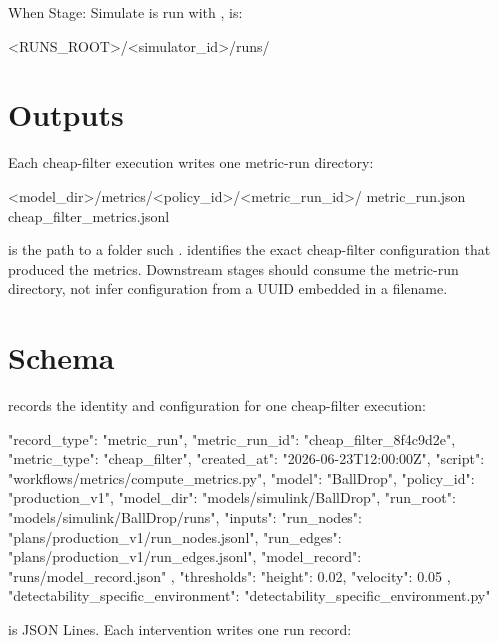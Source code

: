 \documentclass[11pt]{article}
\begin{document}
When Stage: Simulate is run with ,  is:

\begin{DocCode}
<RUNS_ROOT>/<simulator_id>/runs/
\end{DocCode}

\section*{Outputs}

Each cheap-filter execution writes one metric-run directory:

\begin{DocCode}
<model_dir>/metrics/<policy_id>/<metric_run_id>/
  metric_run.json
  cheap_filter_metrics.jsonl
\end{DocCode}

 is the path to a folder such .
 identifies the exact cheap-filter configuration that produced the metrics.
Downstream stages should consume the metric-run directory, not infer configuration from a UUID embedded in a filename.

\section*{Schema}

 records the identity and configuration for one cheap-filter execution:

\begin{DocCode}
{
  "record_type": "metric_run",
  "metric_run_id": "cheap_filter_8f4c9d2e",
  "metric_type": "cheap_filter",
  "created_at": "2026-06-23T12:00:00Z",
  "script": "workflows/metrics/compute_metrics.py",
  "model": "BallDrop",
  "policy_id": "production_v1",
  "model_dir": "models/simulink/BallDrop",
  "run_root": "models/simulink/BallDrop/runs",
  "inputs": {
    "run_nodes": "plans/production_v1/run_nodes.jsonl",
    "run_edges": "plans/production_v1/run_edges.jsonl",
    "model_record": "runs/model_record.json"
  },
  "thresholds": {
    "height": 0.02,
    "velocity": 0.05
  },
  "detectability_specific_environment": "detectability_specific_environment.py"
}
\end{DocCode}

 is JSON Lines.
Each intervention writes one run record:
\end{document}
